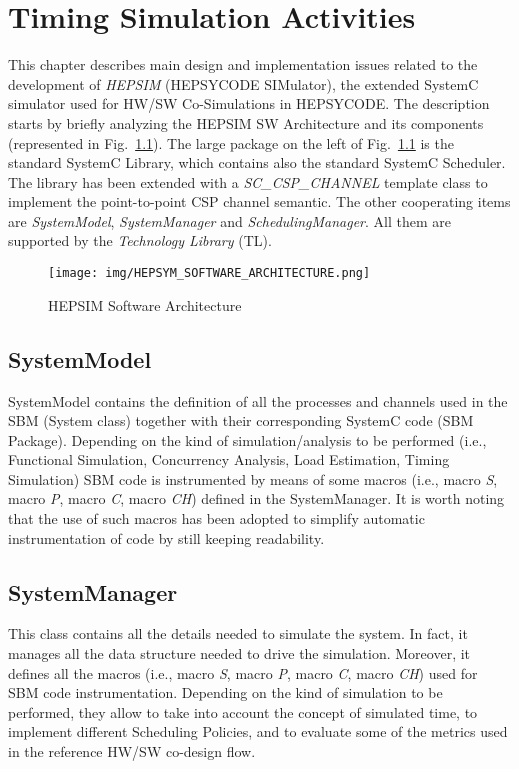 \chapter{Timing Simulation Activities}\label{timing_simulator}
%
This chapter describes main design and implementation issues related to the development of \textit{HEPSIM} (HEPSYCODE SIMulator), the extended SystemC simulator used for HW/SW Co-Simulations in HEPSYCODE. The description starts by briefly analyzing the HEPSIM SW Architecture and its components (represented in Fig.~\ref{hepsim1}). The large package on the left of Fig.~\ref{hepsim1} is the standard SystemC Library, which contains also the standard SystemC Scheduler. The library has been extended with a \textit{SC\_CSP\_CHANNEL} template class to implement the point-to-point CSP channel semantic. The other cooperating items are \textit{SystemModel}, \textit{SystemManager} and \textit{SchedulingManager}. All them are supported by the \textit{Technology Library} (TL). 
%
\begin{figure}[!ht]
\centerline{\texttt{[image: img/HEPSYM\_SOFTWARE\_ARCHITECTURE.png]}}
\caption{HEPSIM Software Architecture}\label{hepsim1}
\end{figure}
%
\section{SystemModel}
%
SystemModel contains the definition of all the processes and channels used in the SBM (System class) together with their corresponding SystemC code (SBM Package). Depending on the kind of simulation/analysis to be performed (i.e., Functional Simulation, Concurrency Analysis, Load Estimation, Timing Simulation) SBM code is instrumented by means of some macros (i.e., macro \textit{S}, macro \textit{P}, macro \textit{C}, macro \textit{CH}) defined in the SystemManager. It is worth noting that the use of such macros has been adopted to simplify automatic instrumentation of code by still keeping readability.
%
\section{SystemManager}
%
This class contains all the details needed to simulate the system. In fact, it manages all the data structure needed to drive the simulation. Moreover, it defines all the macros (i.e., macro \textit{S}, macro \textit{P}, macro \textit{C}, macro \textit{CH}) used for SBM code instrumentation. Depending on the kind of simulation to be performed, they allow to take into account the concept of simulated time, to implement different Scheduling Policies, and to evaluate some of the metrics used in the reference HW/SW co-design flow.
%
